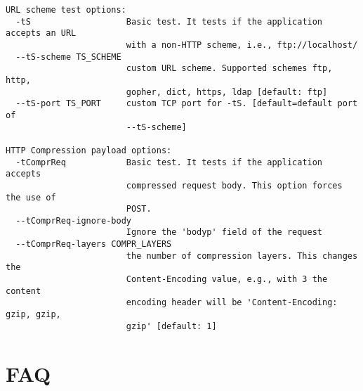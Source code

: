 \documentclass[10pt,a4paper]{article}
\begin{document}
\begin{verbatim}
URL scheme test options:
  -tS                   Basic test. It tests if the application accepts an URL
                        with a non-HTTP scheme, i.e., ftp://localhost/
  --tS-scheme TS_SCHEME
                        custom URL scheme. Supported schemes ftp, http,
                        gopher, dict, https, ldap [default: ftp]
  --tS-port TS_PORT     custom TCP port for -tS. [default=default port of
                        --tS-scheme]

HTTP Compression payload options:
  -tComprReq            Basic test. It tests if the application accepts
                        compressed request body. This option forces the use of
                        POST.
  --tComprReq-ignore-body
                        Ignore the 'bodyp' field of the request
  --tComprReq-layers COMPR_LAYERS
                        the number of compression layers. This changes the
                        Content-Encoding value, e.g., with 3 the content
                        encoding header will be 'Content-Encoding: gzip, gzip,
                        gzip' [default: 1]
\end{verbatim}

\section{FAQ}
\end{document}
